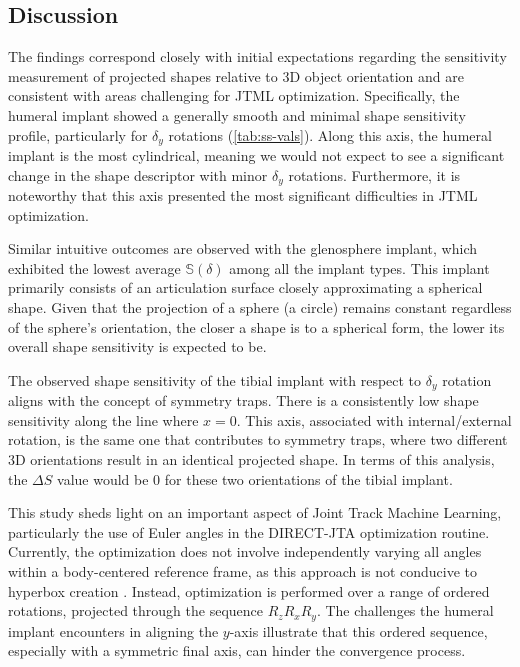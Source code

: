 \subsection{Discussion}
The findings correspond closely with initial expectations regarding the sensitivity measurement of projected shapes relative to 3D object orientation and are consistent with areas challenging for JTML optimization.
Specifically, the humeral implant showed a generally smooth and minimal shape sensitivity profile, particularly for $\delta_{y}$ rotations (\cref{tab:ss-vals}).
Along this axis, the humeral implant is the most cylindrical, meaning we would not expect to see a significant change in the shape descriptor with minor $\delta_{y}$ rotations.
Furthermore, it is noteworthy that this axis presented the most significant difficulties in JTML optimization.

Similar intuitive outcomes are observed with the glenosphere implant, which exhibited the lowest average $\mathbb{S}(\delta)$ among all the implant types.
This implant primarily consists of an articulation surface closely approximating a spherical shape.
Given that the projection of a sphere (a circle) remains constant regardless of the sphere's orientation, the closer a shape is to a spherical form, the lower its overall shape sensitivity is expected to be.

The observed shape sensitivity of the tibial implant with respect to $\delta_{y}$ rotation aligns with the concept of symmetry traps.
There is a consistently low shape sensitivity along the line where $x=0$.
This axis, associated with internal/external rotation, is the same one that contributes to symmetry traps, where two different 3D orientations result in an identical projected shape.
In terms of this analysis, the $\Delta S$ value would be $0$ for these two orientations of the tibial implant.

This study sheds light on an important aspect of Joint Track Machine Learning, particularly the use of Euler angles in the DIRECT-JTA optimization routine.
Currently, the optimization does not involve independently varying all angles within a body-centered reference frame, as this approach is not conducive to hyperbox creation \cite{floodAutomatedRegistration3D2018,jonesLipschitzianOptimizationLipschitz1993}.
Instead, optimization is performed over a range of ordered rotations, projected through the sequence $R_{z}R_{x}R_{y}$.
The challenges the humeral implant encounters in aligning the $y$-axis illustrate that this ordered sequence, especially with a symmetric final axis, can hinder the convergence process.


